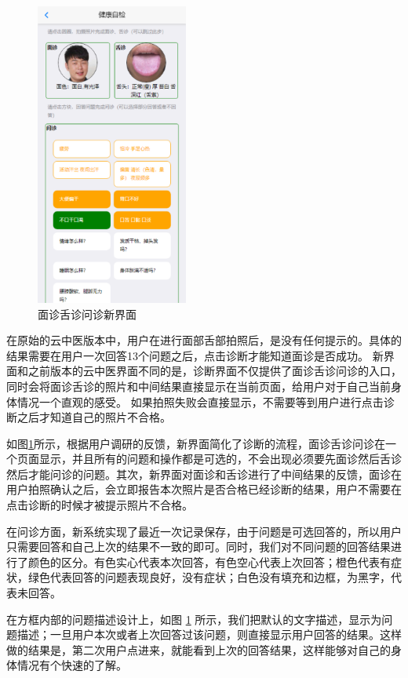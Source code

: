 \begin{figure}[h]
    \centering
    \includegraphics[height=10cm]{images/diag.png}
    \caption{面诊舌诊问诊新界面}
    \label{fig:diag_new}
\end{figure}
在原始的云中医版本中，用户在进行面部舌部拍照后，是没有任何提示的。具体的结果需要在用户一次回答13个问题之后，点击诊断才能知道面诊是否成功。
新界面和之前版本的云中医界面不同的是，诊断界面不仅提供了面诊舌诊问诊的入口，同时会将面诊舌诊的照片和中间结果直接显示在当前页面，给用户对于自己当前身体情况一个直观的感受。
如果拍照失败会直接显示，不需要等到用户进行点击诊断之后才知道自己的照片不合格。
    
如图\ref{fig:diag_new}所示，根据用户调研的反馈，新界面简化了诊断的流程，面诊舌诊问诊在一个页面显示，并且所有的问题和操作都是可选的，不会出现必须要先面诊然后舌诊然后才能问诊的问题。其次，新界面对面诊和舌诊进行了中间结果的反馈，面诊在用户拍照确认之后，会立即报告本次照片是否合格已经诊断的结果，用户不需要在点击诊断的时候才被提示照片不合格。

在问诊方面，新系统实现了最近一次记录保存，由于问题是可选回答的，所以用户只需要回答和自己上次的结果不一致的即可。同时，我们对不同问题的回答结果进行了颜色的区分。有色实心代表本次回答，有色空心代表上次回答；橙色代表有症状，绿色代表回答的问题表现良好，没有症状；白色没有填充和边框，为黑字，代表未回答。

在方框内部的问题描述设计上，如图 \ref{fig:diag_new} 所示，我们把默认的文字描述，显示为问题描述；一旦用户本次或者上次回答过该问题，则直接显示用户回答的结果。这样做的结果是，第二次用户点进来，就能看到上次的回答结果，这样能够对自己的身体情况有个快速的了解。


